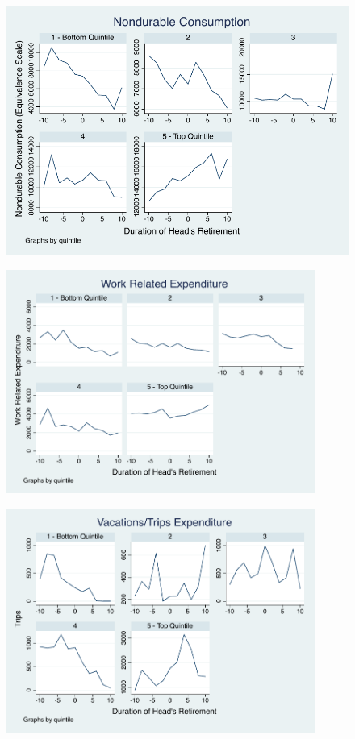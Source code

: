 \documentclass[11pt,onecolumn]{article}
\numberwithin{figure}{section}
\begin{document}
\begin{figure}[h]
	\centering
	\includegraphics[width=1\textwidth]{../ConsumptionPostRetirement/expenditure_blundell_eq.pdf}
\end{figure}

\begin{figure}[h]
	\centering
	\includegraphics[width=0.9\textwidth]{../ConsumptionPostRetirement/work.pdf}
\end{figure}


\begin{figure}[h]
	\centering
	\includegraphics[width=0.9\textwidth]{../ConsumptionPostRetirement/trips.pdf}
\end{figure}
\end{document}
